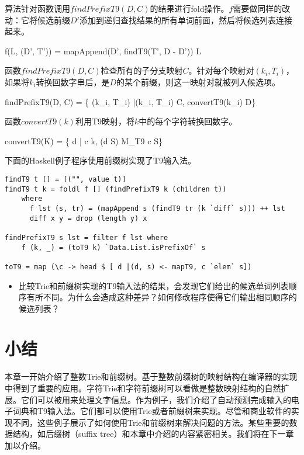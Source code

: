 \documentclass[UTF8]{article}
\begin{document}
算法针对函数调用$findPrefixT9(D, C)$的结果进行fold操作。$f$需要做同样的改动：它将候选前缀$D'$添加到递归查找结果的所有单词前面，然后将候选列表连接起来。

\be
f(L, (D', T')) = mapAppend(D', findT9(T', D - D')) \cup L
\ee

函数$findPrefixT9(D, C)$检查所有的子分支映射$C$。针对每个映射对$(k_i, T_i)$，如果将$k_i$转换回数字串后，是$D$的某个前缀，则这一映射对就被列入候选项。

\be
findPrefixT9(D, C) = \{ (k_i, T_i) |(k_i, T_i) \in C, convertT9(k_i) \sqsubset D\}
\ee

函数$convertT9(k)$利用T9映射，将$k$中的每个字符转换回数字。

\be
convertT9(K) = \{ d | \forall c \in k, \exists (d \rightarrow S) \in M_{T9} \Rightarrow c \in S\}
\ee

下面的Haskell例子程序使用前缀树实现了T9输入法。

\begin{lstlisting}[style=Haskell]
findT9 t [] = [("", value t)]
findT9 t k = foldl f [] (findPrefixT9 k (children t))
    where
      f lst (s, tr) = (mapAppend s (findT9 tr (k `diff` s))) ++ lst
      diff x y = drop (length y) x

findPrefixT9 s lst = filter f lst where
    f (k, _) = (toT9 k) `Data.List.isPrefixOf` s

toT9 = map (\c -> head $ [ d |(d, s) <- mapT9, c `elem` s])
\end{lstlisting}

\begin{Exercise}
\begin{itemize}
\item 比较Trie和前缀树实现的T9输入法的结果，会发现它们给出的候选单词列表顺序有所不同。为什么会造成这种差异？如何修改程序使得它们输出相同顺序的候选列表？
\end{itemize}
\end{Exercise}

\section{小结}

本章一开始介绍了整数Trie和前缀树。基于整数前缀树的映射结构在编译器的实现中得到了重要的应用。字符Trie和字符前缀树可以看做是整数映射结构的自然扩展。它们可以被用来处理文字信息。作为例子，我们介绍了自动预测完成输入的电子词典和T9输入法。它们都可以使用Trie或者前缀树来实现。尽管和商业软件的实现不同，这些例子展示了如何使用Trie和前缀树来解决问题的方法。某些重要的数据结构，如后缀树（suffix tree）和本章中介绍的内容紧密相关。我们将在下一章加以介绍。
\end{document}
